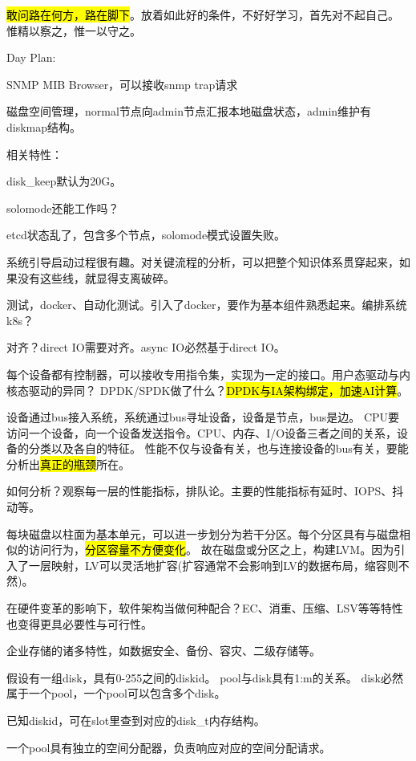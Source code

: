 \hl{敢问路在何方，路在脚下}。放着如此好的条件，不好好学习，首先对不起自己。
惟精以察之，惟一以守之。

Day Plan:
\begin{enumbox}
\item SNMP MIB Browser，可以接收snmp trap请求
\end{enumbox}

磁盘空间管理，normal节点向admin节点汇报本地磁盘状态，admin维护有diskmap结构。

相关特性：
\begin{enumbox}
\item disk\_keep默认为20G。
\item solomode还能工作吗？
\item etcd状态乱了，包含多个节点，solomode模式设置失败。
\end{enumbox}

系统引导启动过程很有趣。对关键流程的分析，可以把整个知识体系贯穿起来，如果没有这些线，就显得支离破碎。

测试，docker、自动化测试。引入了docker，要作为基本组件熟悉起来。编排系统k8s？

对齐？direct IO需要对齐。async IO必然基于direct IO。

每个设备都有控制器，可以接收专用指令集，实现为一定的接口。用户态驱动与内核态驱动的异同？
DPDK/SPDK做了什么？\hl{DPDK与IA架构绑定，加速AI计算}。

设备通过bus接入系统，系统通过bus寻址设备，设备是节点，bus是边。
CPU要访问一个设备，向一个设备发送指令。CPU、内存、I/O设备三者之间的关系，设备的分类以及各自的特征。
性能不仅与设备有关，也与连接设备的bus有关，要能分析出\hl{真正的瓶颈}所在。

如何分析？观察每一层的性能指标，排队论。主要的性能指标有延时、IOPS、抖动等。

每块磁盘以柱面为基本单元，可以进一步划分为若干分区。每个分区具有与磁盘相似的访问行为，\hl{分区容量不方便变化}。
故在磁盘或分区之上，构建LVM。因为引入了一层映射，LV可以灵活地扩容(扩容通常不会影响到LV的数据布局，缩容则不然)。

在硬件变革的影响下，软件架构当做何种配合？EC、消重、压缩、LSV等等特性也变得更具必要性与可行性。

企业存储的诸多特性，如数据安全、备份、容灾、二级存储等。

假设有一组disk，具有0-255之间的diskid。
pool与disk具有1:m的关系。
disk必然属于一个pool，一个pool可以包含多个disk。

已知diskid，可在slot里查到对应的disk\_t内存结构。

一个pool具有独立的空间分配器，负责响应对应的空间分配请求。

